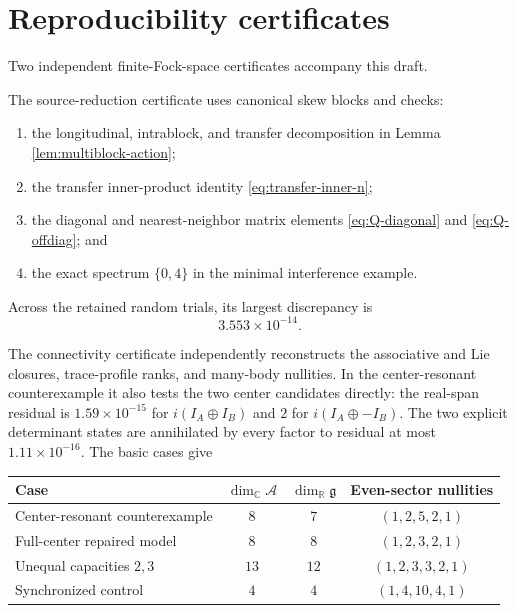 \documentclass[11pt]{article}
\numberwithin{equation}{section}
\newcommand{\cA}{\mathcal A}
\newcommand{\fg}{\mathfrak g}
\begin{document}
\section{Reproducibility certificates}

Two independent finite-Fock-space certificates accompany this draft.

The source-reduction certificate uses canonical skew blocks and checks:
\begin{enumerate}[leftmargin=2.2em]
\item the longitudinal, intrablock, and transfer decomposition in Lemma \ref{lem:multiblock-action};
\item the transfer inner-product identity \eqref{eq:transfer-inner-n};
\item the diagonal and nearest-neighbor matrix elements \eqref{eq:Q-diagonal} and \eqref{eq:Q-offdiag}; and
\item the exact spectrum $\{0,4\}$ in the minimal interference example.
\end{enumerate}
Across the retained random trials, its largest discrepancy is
\begin{equation}
 3.553\times10^{-14}.
 \label{eq:numerical-error}
\end{equation}

The connectivity certificate independently reconstructs the associative and Lie closures, trace-profile ranks, and many-body nullities.  In the center-resonant counterexample it also tests the two center candidates directly: the real-span residual is $1.59\times10^{-15}$ for $i(I_A\oplus I_B)$ and $2$ for $i(I_A\oplus-I_B)$.  The two explicit determinant states are annihilated by every factor to residual at most $1.11\times10^{-16}$.  The basic cases give
\begin{center}
\begin{tabular}{lccc}
\toprule
Case & $\dim_{\mathbb C}\cA$ & $\dim_{\mathbb R}\fg$ & Even-sector nullities\\
\midrule
Center-resonant counterexample & $8$ & $7$ & $(1,2,5,2,1)$\\
Full-center repaired model & $8$ & $8$ & $(1,2,3,2,1)$\\
Unequal capacities $2,3$ & $13$ & $12$ & $(1,2,3,3,2,1)$\\
Synchronized control & $4$ & $4$ & $(1,4,10,4,1)$\\
\bottomrule
\end{tabular}
\end{center}
\end{document}
